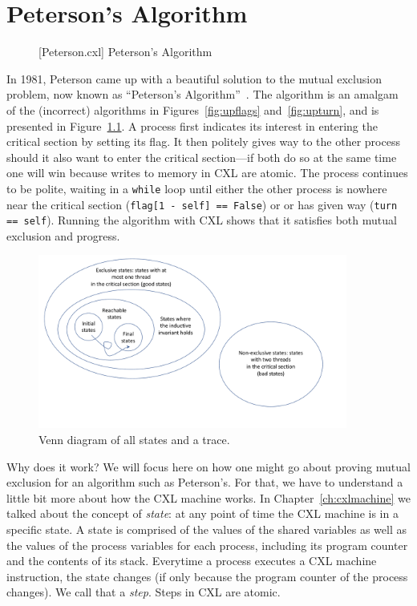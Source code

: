 \documentclass{report}
\newenvironment{code}{
\tcolorbox
}{
\endtcolorbox
}
\begin{document}
\chapter{Peterson's Algorithm}
\label{ch:peterson}

\begin{figure}
\begin{code}
\end{code}
\caption{[Peterson.cxl] Peterson's Algorithm}
\label{fig:peterson}
\end{figure}

In 1981, Peterson came up with a beautiful solution to the mutual exclusion
problem, now known as ``Peterson's Algorithm''~\cite{Peterson81}.
The algorithm is an amalgam of the (incorrect) algorithms in
Figures~\ref{fig:upflags} and~\ref{fig:upturn}, and is presented
in Figure~\ref{fig:peterson}.
A process first indicates its interest in entering the critical section
by setting its flag.
It then politely gives way to the other process should it also want to
enter the critical section---if both do so at the same time one will
win because writes to memory in CXL are atomic.
The process continues to be polite, waiting in a \texttt{while} loop
until either the other process is nowhere near the critical section
(\texttt{flag[1 - self] == False}) or or has given way
(\texttt{turn == self}).
Running the algorithm with CXL shows that it satisfies both mutual
exclusion and progress.

\begin{figure}
\begin{center}
\includegraphics[width=4in]{figures/states-crop.pdf}
\end{center}
\caption{Venn diagram of all states and a trace.}
\label{fig:states}
\end{figure}

Why does it work?  We will focus here on how one might go about proving
mutual exclusion for an algorithm such as Peterson's.
For that, we have to understand a little bit more about how the CXL
machine works.
In Chapter~\ref{ch:cxlmachine} we talked about the concept of \emph{state}:
at any point of time the CXL machine is in a specific state.
A state is comprised of the values of the shared variables as well as
the values of the process variables for each process, including its
program counter and the contents of its stack.
Everytime a process executes a CXL machine instruction, the
state changes (if only because the program counter of the process
changes).  We call that a \emph{step}.
Steps in CXL are atomic.
\end{document}
